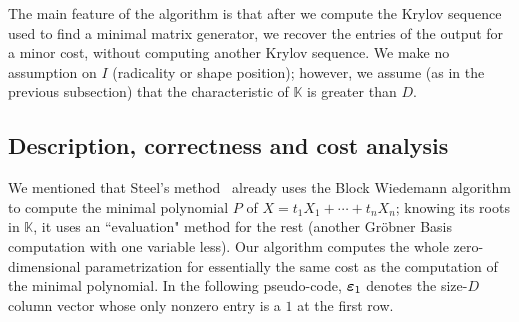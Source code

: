\documentclass[12pt]{article}
\newcommand{\col}[1]{\bm{\MakeLowercase{#1}}} %
\newcommand{\minpoly}{P}
\newcommand{\lf}{X}
\def\K{\mathbb{K}}
\def\K {\ensuremath{\mathbb{K}}}
\begin{document}
The main feature of the algorithm is that after we compute the Krylov
sequence used to find a minimal matrix generator, we recover the
entries of the output for a minor cost, without computing another
Krylov sequence. We make no assumption on $I$ (radicality or shape
position); however, we assume (as in the previous subsection) that the
characteristic of $\K$ is greater than $D$.



\subsection{Description, correctness and cost analysis}

We mentioned that Steel's method~\cite{Steel15} already uses the Block
Wiedemann algorithm to compute the minimal polynomial $\minpoly$ of
$\lf=t_1 X_1 + \cdots + t_n X_n$; knowing its roots in $\K$, it uses
an ``evaluation" method for the rest (another Gr\"obner Basis
computation with one variable less).  Our algorithm computes the whole
zero-dimensional parametrization for essentially the same cost as the
computation of the minimal polynomial. In the following pseudo-code,
$\col{\varepsilon}_1$ denotes the size-$D$ column vector whose only
nonzero entry is a $1$ at the first row.

\end{document}
